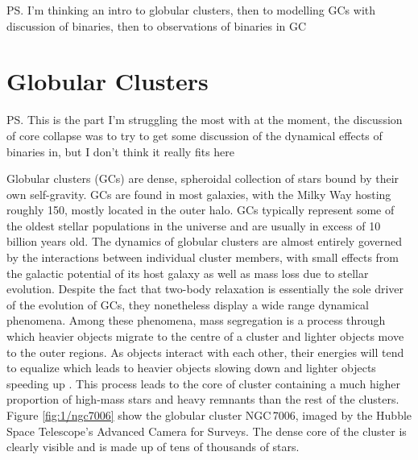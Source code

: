 \ps{I'm thinking an intro to globular clusters, then to modelling GCs with discussion of binaries,
	then to observations of binaries in GC}

\section{Globular Clusters}



\ps{This is the part I'm struggling the most with at the moment, the discussion of core collapse was
	to try to get some discussion of the dynamical effects of binaries in, but I don't think it really
	fits here}

Globular clusters (GCs) are dense, spheroidal collection of stars bound by their own self-gravity.
GCs are found in most galaxies, with the Milky Way hosting roughly 150, mostly located in the outer
halo. GCs typically represent some of the oldest stellar populations in the universe and are usually
in excess of 10 billion years old. The dynamics of globular clusters are almost entirely governed by
the interactions between individual cluster members, with small effects from the galactic potential
of its host galaxy as well as mass loss due to stellar evolution. Despite the fact that two-body
relaxation is essentially the sole driver of the evolution of GCs, they nonetheless display a wide
range dynamical phenomena. Among these phenomena, mass segregation is a process through which
heavier objects migrate to the centre of a cluster and lighter objects move to the outer regions. As
objects interact with each other, their energies will tend to equalize which leads to heavier
objects slowing down and lighter objects speeding up \citep{Heggie2003}. This process leads to the
core of cluster containing a much higher proportion of high-mass stars and heavy remnants than the
rest of the clusters. Figure \ref{fig:1/ngc7006} show the globular cluster NGC\,7006, imaged by the
Hubble Space Telescope's Advanced Camera for Surveys. The dense core of the cluster is clearly
visible and is made up of tens of thousands of stars.


